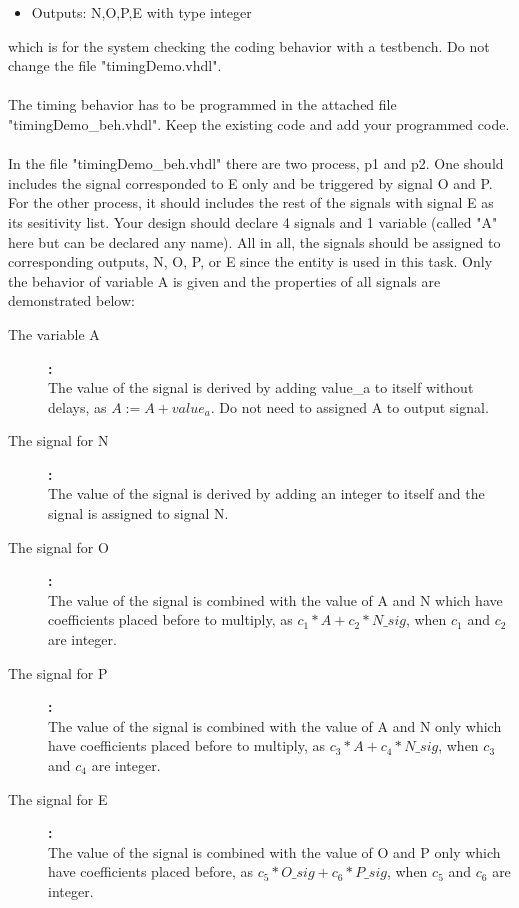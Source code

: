 \documentclass[a4paper,12pt]{article}
\begin{document}
\begin{itemize}
\item Outputs: N,O,P,E with type integer
\end{itemize}
which is for the system checking the coding behavior with a testbench. Do not change the file "timingDemo.vhdl".
\\
\\
The timing behavior has to be programmed in the attached file "timingDemo\_beh.vhdl".  Keep the existing code and add your programmed code.
\\
\\
In the file "timingDemo\_beh.vhdl" there are two process, p1 and p2. One should includes the signal corresponded to E only and be triggered by signal O and P. For the other process, it should includes the rest of the signals with signal E as its sesitivity list. Your design should declare 4 signals and 1 variable (called "A" here but can be declared any name). All in all, the signals should be assigned to corresponding outputs, N, O, P, or E since the entity is used in this task. Only the behavior of variable A is given and the properties of all signals are demonstrated below:
\begin{description}
\item [The variable A]\textbf{:} \\
The value of the signal is derived by adding {{value_a}} to itself without delays, as $A := A + {{value_a}} $. Do not need to assigned A to output signal.

\item [The signal for N]\textbf{:} \\
The value of the signal is derived by adding an integer to itself and the signal is assigned to signal N.

\item [The signal for O]\textbf{:} \\
The value of the signal is combined with the value of A and N which have coefficients placed before to multiply, as $c_{1} * A + c_{2} * N\_sig$, when $c_{1}$ and $c_{2}$ are integer.

\item [The signal for P]\textbf{:} \\
The value of the signal is combined with the value of A and N only which have coefficients placed before to multiply, as $c_{3} * A + c_{4} * N\_sig$, when $c_{3}$ and $c_{4}$ are integer.

\item [The signal for E]\textbf{:} \\
The value of the signal is combined with the value of O and P only which have coefficients placed before, as $c_{5} * O\_sig + c_{6} * P\_sig$, when $c_{5}$ and $c_{6}$ are integer.
\\
\end{description}
\end{document}
